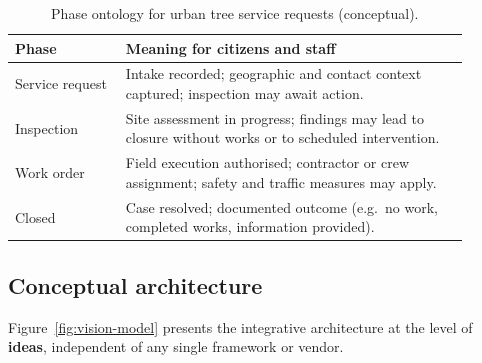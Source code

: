 \documentclass[12pt,a4paper]{article}
\begin{document}
\begin{table}[htbp]
\centering
\caption{Phase ontology for urban tree service requests (conceptual).}
\label{tab:phase}
\begin{tabular}{@{}p{0.22\linewidth}p{0.68\linewidth}@{}}
\toprule
\textbf{Phase} & \textbf{Meaning for citizens and staff} \\
\midrule
Service request & Intake recorded; geographic and contact context captured; inspection may await action. \\
Inspection & Site assessment in progress; findings may lead to closure without works or to scheduled intervention. \\
Work order & Field execution authorised; contractor or crew assignment; safety and traffic measures may apply. \\
Closed & Case resolved; documented outcome (e.g.\ no work, completed works, information provided). \\
\bottomrule
\end{tabular}
\end{table}

\subsection{Conceptual architecture}

Figure~\ref{fig:vision-model} presents the integrative architecture at the level of \textbf{ideas}, independent of any single framework or vendor.
\end{document}
